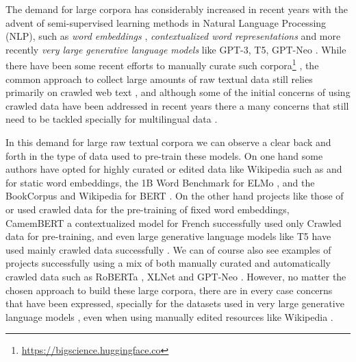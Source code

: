 The demand for large corpora has considerably increased in recent years with the advent of semi-supervised learning methods in Natural Language Processing (NLP), such as \emph{word embeddings} \cite{mikolov-etal-2013-distributed,pennington-etal-2014-glove,mikolov-etal-2018-advances}, \emph{contextualized word representations} \cite{howard-ruder-2018-universal,peters-etal-2018-deep,devlin-etal-2019-bert} and more recently \emph{very large generative language models} like GPT-3, T5, GPT-Neo \cite{raffel-etal-2020-exploring,brown-etal-2020-language,black-etal-2021-gpt}. While there have been some recent efforts to manually curate such corpora\footnote{\url{https://bigscience.huggingface.co}} \cite{gao-etal-2020-pile}, the common approach to collect large amounts of raw textual data still relies primarily on crawled web text \cite{ortiz-suarez-etal-2019-asynchronous,ortiz-suarez-etal-2020-monolingual,xue-etal-2021-mt5,el-kishky-etal-2020-ccaligned,espla-etal-2019-paracrawl,banon-etal-2020-paracrawl,gao-etal-2020-pile}, and although some of the initial concerns of using crawled data \cite{trinh-le-2018-a,radford-etal-2019-language} have been addressed in recent years \cite{ortiz-suarez-etal-2020-monolingual,martin-etal-2020-camembert} there a many concerns that still need to be tackled \cite{caswell-etal-2020-language} specially for multilingual data \cite{kreutzer-etal-2021-quality}.

In this demand for large raw textual corpora we can observe a clear back and forth in the type of data used to pre-train these models. On one hand some authors have opted for highly curated or edited data like Wikipedia such as  and  for static word embeddings, the 1B Word Benchmark \cite{chelba-etal-2014-one} for ELMo \cite{peters-etal-2018-deep}, and the BookCorpus \cite{zhu-etal-2015-aligning} and Wikipedia for BERT \cite{devlin-etal-2019-bert}. On the other hand projects like those of  or  used crawled data for the pre-training of fixed word embeddings, CamemBERT \cite{martin-etal-2020-camembert} a contextualized model for French successfully used only Crawled data for pre-training, and even large generative language models like T5 have used mainly crawled data successfully \cite{raffel-etal-2020-exploring}. We can of course also see examples of projects successfully using a mix of both manually curated and automatically crawled data such as RoBERTa \cite{liu-etal-2019-roberta}, XLNet \cite{yang-etal-2019-xlnet} and GPT-Neo \cite{black-etal-2021-gpt,gao-etal-2020-pile}. However, no matter the chosen approach to build these large corpora, there are in every case concerns that have been expressed, specially for the datasets used in very large generative language models \cite{bender-etal-2021-on}, even when using manually edited resources like Wikipedia \cite{barera-2020-mind}.

